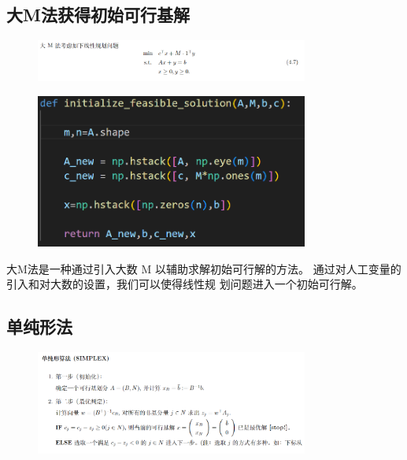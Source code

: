 \documentclass[10pt,a4paper,oneside]{article}
\begin{document}
\subsection{大M法获得初始可行基解}

\begin{figure}[H]
    \centering
    \includegraphics[width=0.8\textwidth]{屏幕截图 2024-11-05 111702.png}
\end{figure}

\begin{figure}[H]
    \centering
    \includegraphics[width=0.8\textwidth]{屏幕截图 2024-11-05 104603.png}
\end{figure}

大M法是一种通过引入大数 M 以辅助求解初始可行解的方法。
通过对人工变量的引入和对大数的设置，我们可以使得线性规
划问题进入一个初始可行解。

\subsection{单纯形法}

\begin{figure}[H]
    \centering
    \includegraphics[width=0.8\textwidth]{屏幕截图 2024-11-05 112024.png}
\end{figure}
\end{document}
